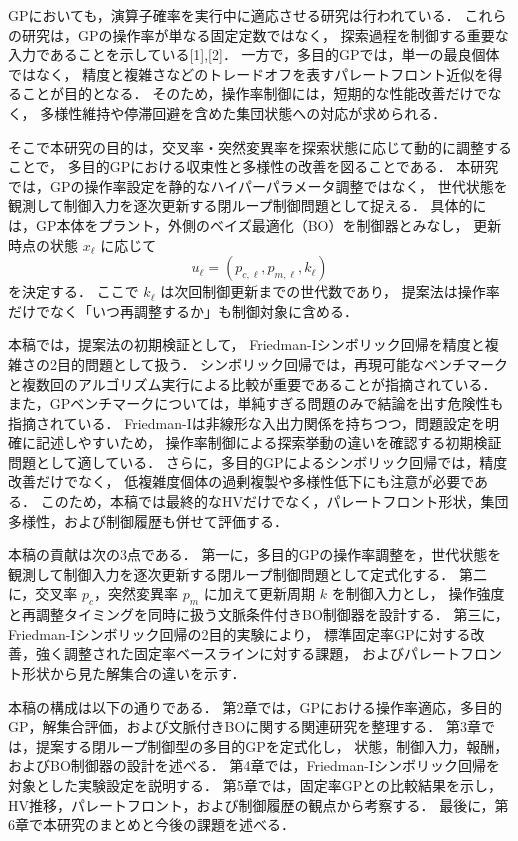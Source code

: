 \documentclass[a4paper,10pt,twocolumn]{ltjsarticle}
\begin{document}
GPにおいても，演算子確率を実行中に適応させる研究は行われている．
これらの研究は，GPの操作率が単なる固定定数ではなく，
探索過程を制御する重要な入力であることを示している[1],[2]．
一方で，多目的GPでは，単一の最良個体ではなく，
精度と複雑さなどのトレードオフを表すパレートフロント近似を得ることが目的となる．
そのため，操作率制御には，短期的な性能改善だけでなく，
多様性維持や停滞回避を含めた集団状態への対応が求められる．

そこで本研究の目的は，交叉率・突然変異率を探索状態に応じて動的に調整することで，
多目的GPにおける収束性と多様性の改善を図ることである．
本研究では，GPの操作率設定を静的なハイパーパラメータ調整ではなく，
世代状態を観測して制御入力を逐次更新する閉ループ制御問題として捉える．
具体的には，GP本体をプラント，外側のベイズ最適化（BO）を制御器とみなし，
更新時点の状態 \(x_\ell\) に応じて
\[
  u_\ell=(p_{c,\ell},p_{m,\ell},k_\ell)
\]
を決定する．
ここで \(k_\ell\) は次回制御更新までの世代数であり，
提案法は操作率だけでなく「いつ再調整するか」も制御対象に含める．

本稿では，提案法の初期検証として，
Friedman-Iシンボリック回帰を精度と複雑さの2目的問題として扱う．
シンボリック回帰では，再現可能なベンチマークと複数回のアルゴリズム実行による比較が重要であることが指摘されている\cite{lacava2021}．
また，GPベンチマークについては，単純すぎる問題のみで結論を出す危険性も指摘されている\cite{mcdermott2012,white2013}．
Friedman-Iは非線形な入出力関係を持ちつつ，問題設定を明確に記述しやすいため，
操作率制御による探索挙動の違いを確認する初期検証問題として適している．
さらに，多目的GPによるシンボリック回帰では，精度改善だけでなく，
低複雑度個体の過剰複製や多様性低下にも注意が必要である\cite{liu2022}．
このため，本稿では最終的なHVだけでなく，パレートフロント形状，集団多様性，および制御履歴も併せて評価する．

本稿の貢献は次の3点である．
第一に，多目的GPの操作率調整を，世代状態を観測して制御入力を逐次更新する閉ループ制御問題として定式化する．
第二に，交叉率 \(p_c\)，突然変異率 \(p_m\) に加えて更新周期 \(k\) を制御入力とし，
操作強度と再調整タイミングを同時に扱う文脈条件付きBO制御器を設計する．
第三に，Friedman-Iシンボリック回帰の2目的実験により，
標準固定率GPに対する改善，強く調整された固定率ベースラインに対する課題，
およびパレートフロント形状から見た解集合の違いを示す．

本稿の構成は以下の通りである．
第2章では，GPにおける操作率適応，多目的GP，解集合評価，および文脈付きBOに関する関連研究を整理する．
第3章では，提案する閉ループ制御型の多目的GPを定式化し，
状態，制御入力，報酬，およびBO制御器の設計を述べる．
第4章では，Friedman-Iシンボリック回帰を対象とした実験設定を説明する．
第5章では，固定率GPとの比較結果を示し，
HV推移，パレートフロント，および制御履歴の観点から考察する．
最後に，第6章で本研究のまとめと今後の課題を述べる．
\end{document}
